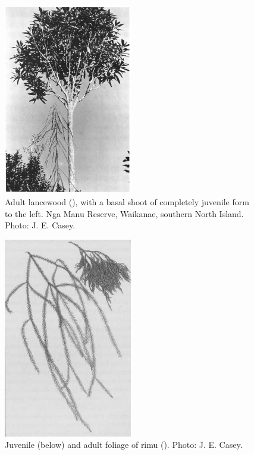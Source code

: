 \begin{figure}
	\includegraphics[width=0.5\textwidth]{graphics/figure20lancewood.jpg}
	\centering
	\caption[Adult lancewood]{Adult lancewood (), with a basal shoot of completely juvenile form to the left.
Nga Manu Reserve, Waikanae, southern North Island.
	Photo: J. E. Casey.}%
	\label{fig:20lancewood}
\end{figure}

\begin{figure}
	\includegraphics[width=0.5\textwidth]{graphics/figure21rimu.jpg}
	\centering
	\caption[Rimu foliage]{Juvenile (below) and adult foliage of rimu ().
	Photo: J. E. Casey.}%
	\label{fig:21rimu}
\end{figure}

